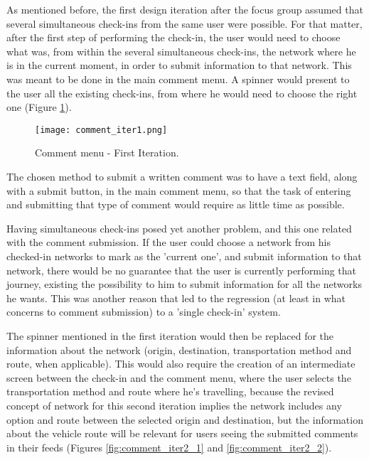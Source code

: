As mentioned before, the first design iteration after the focus group assumed that several simultaneous check-ins from the same user were possible. For that matter, after the first step of performing the check-in, the user would need to choose what was, from within the several simultaneous check-ins, the network where he is in the current moment, in order to submit information to that network.
This was meant to be done in the main comment menu. A spinner would present to the user all the existing check-ins, from where he would need to choose the right one (Figure \ref{fig:comment_iter1}).

\begin{figure}[h!]
  \begin{center}
    \leavevmode
    \texttt{[image: comment\_iter1.png]}
    \caption{Comment menu - First Iteration.}
    \label{fig:comment_iter1}
  \end{center}
\end{figure}

The chosen method to submit a written comment was to have a text field, along with a submit button, in the main comment menu, so that the task of entering and submitting that type of comment would require as little time as possible.



Having simultaneous check-ins posed yet another problem, and this one related with the comment submission. If the user could choose a network from his checked-in networks to mark as the 'current one', and submit information to that network, there would be no guarantee that the user is currently performing that journey, existing the possibility to him to submit information for all the networks he wants. This was another reason that led to the regression (at least in what concerns to comment submission) to a 'single check-in' system.

The spinner mentioned in the first iteration would then be replaced for the information about the network (origin, destination, transportation method and route, when applicable). This would also require the creation of an intermediate screen between the check-in and the comment menu, where the user selects the transportation method and route where he's travelling, because the revised concept of network for this second iteration implies the network includes any option and route between the selected origin and destination, but the information about the vehicle route will be relevant for users seeing the submitted comments in their feeds (Figures \ref{fig:comment_iter2_1} and \ref{fig:comment_iter2_2}).

